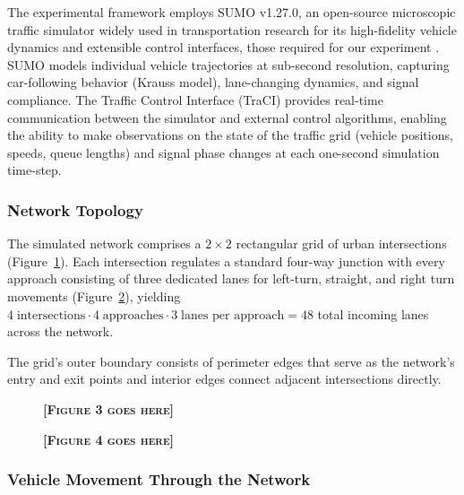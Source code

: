 \documentclass[12pt]{article}
\begin{document}
The experimental framework employs SUMO v1.27.0, an open-source microscopic traffic simulator widely used in transportation research for its high-fidelity vehicle dynamics and extensible control interfaces, those required for our experiment \cite{lopez2018}. SUMO models individual vehicle trajectories at sub-second resolution, capturing car-following behavior (Krauss model), lane-changing dynamics, and signal compliance. The Traffic Control Interface (TraCI) provides real-time communication between the simulator and external control algorithms, enabling the ability to make observations on the state of the traffic grid (vehicle positions, speeds, queue lengths) and signal phase changes at each one-second simulation time-step.



\subsubsection{Network Topology}

The simulated network comprises a $2 \times 2$ rectangular grid of urban intersections (Figure~\ref{fig:grid}). Each intersection regulates a standard four-way junction with every approach consisting of three dedicated lanes for left-turn, straight, and right turn movements (Figure~\ref{fig:lane-structure}), yielding $4 \; \text{intersections} \cdot 4 \; \text{approaches} \cdot 3 \; \text{lanes per approach} = 48$ total incoming lanes across the network.

The grid's outer boundary consists of perimeter edges that serve as the network's entry and exit points and interior edges connect adjacent intersections directly.



\begin{figure}[htbp]
\centering
\textbf{\textsc{[Figure 3 goes here]}}
\label{fig:grid}
\end{figure}

\vspace{1.2175cm}

\begin{figure}[htbp]
\centering
\textbf{\textsc{[Figure 4 goes here]}}
\label{fig:lane-structure}
\end{figure}

\subsubsection{Vehicle Movement Through the Network}
\end{document}
